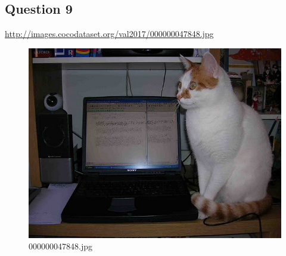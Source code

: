\subsection*{Question 9}
\url{http://images.cocodataset.org/val2017/000000047848.jpg}
    \begin{figure}[h]
        \centering
        \includegraphics[width=0.8\linewidth]{../image set/easy/000000047848.jpg}
        \caption{000000047848.jpg}
    \end{figure}
